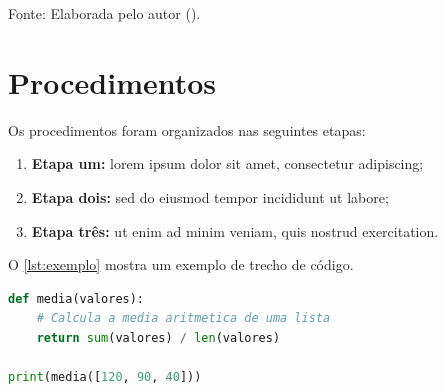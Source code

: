 \begin{table}[!htb]
  \caption{Exemplo de tabela numérica.}
  \label{tab:dados}
  \centering
  {Fonte: Elaborada pelo autor (\the\year{}).}
\end{table}

\section{Procedimentos}
\label{sec:procedimentos}

Os procedimentos foram organizados nas seguintes etapas:

\begin{enumerate}[label=\arabic*.]
  \item \textbf{Etapa um:} lorem ipsum dolor sit amet, consectetur adipiscing;
  \item \textbf{Etapa dois:} sed do eiusmod tempor incididunt ut labore;
  \item \textbf{Etapa três:} ut enim ad minim veniam, quis nostrud exercitation.
\end{enumerate}

O \autoref{lst:exemplo} mostra um exemplo de trecho de código.

\begin{lstlisting}[language=Python, caption={Exemplo de código.}, label={lst:exemplo}]
def media(valores):
    # Calcula a media aritmetica de uma lista
    return sum(valores) / len(valores)

print(media([120, 90, 40]))
\end{lstlisting}

